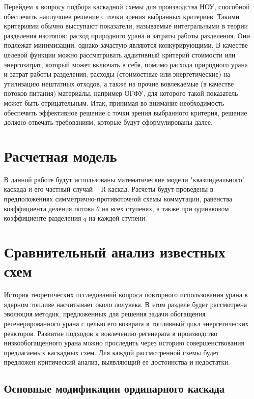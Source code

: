 Перейдем к вопросу подбора каскадной схемы для производства НОУ, способной обеспечить наилучшее решение с точки зрения выбранных критериев.
Такими критериями  обычно выступают показатели, называемые интегральными в теории разделения изотопов: расход природного урана и затраты работы разделения.
Они подлежат минимизации, однако зачастую являются конкурирующими.
В качестве целевой функции можно рассматривать аддитивный критерий стоимости или энергозатрат, который может включать в себя, помимо расхода природного урана и затрат работы разделения, расходы (стоимостные или энергетические) на утилизацию нештатных отходов, а также на прочие вовлекаемые (в качестве потоков питания) материалы, например ОГФУ, для которого такой показатель может быть отрицательным.
Итак, принимая во внимание необходимость обеспечить эффективное решение с точки зрения выбранного критерия, решение должно отвечать требованиям, которые будут сформулированы далее.

\section{Расчетная модель}

В данной работе будут использованы математические модели "квазиидеального" каскада и его частный случай -- R-каскад. Расчеты будут проведены в предположениях симметрично-противоточной схемы коммутации, равенства коэффициента деления потока $\theta$ на всех ступенях, а также при одинаковом коэффициенте разделения $q$ на каждой ступени.

\section{Сравнительный анализ известных схем}

История теоретических исследований вопроса повторного использования урана в ядерном топливе насчитывает около полувека.
В этом разделе будет рассмотрена эволюция методик, предложенных для решения задачи обогащения регенерированного урана с целью его возврата в топливный цикл энергетических реакторов.
Развитие подходов к вовлечению регенерата в производство низкообогащенного урана можно проследить через историю совершенствования предлагаемых каскадных схем.
Для каждой рассмотренной схемы будет предложен критический анализ, выявляющий ее достоинства и недостатки.

\subsection{Основные модификации ординарного каскада}

